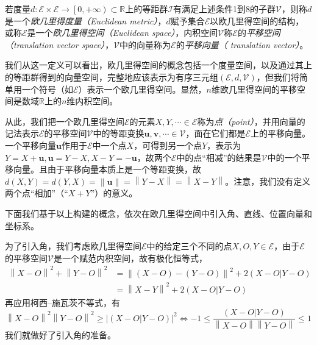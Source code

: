 \documentclass[main.tex]{subfiles}
\begin{document}
\begin{definition}[欧几里得空间]\label{def:II.3.5}
    若度量$d:\mathcal{E}\times\mathcal{E}\rightarrow\left[0,+\infty\right)\subset\mathbb{R}$上的等距群$\mathcal{I}$有满足上述条件1到8的子群$\mathcal{V}$，则称$d$是一个\emph{欧几里得度量（Euclidean metric）}，$d$赋予集合$\mathcal{E}$以欧几里得空间的结构，或称$\mathcal{E}$是一个\emph{欧几里得空间（Euclidean space）}，内积空间$\mathcal{V}$称$\mathcal{E}$的\emph{平移空间（translation vector space）}，$\mathcal{V}$中的向量称为$\mathcal{E}$的\emph{平移向量（ translation vector）}。
\end{definition}

我们从这一定义可以看出，欧几里得空间的概念包括一个度量空间，以及通过其上的等距群得到的向量空间，完整地应该表示为有序三元组$\left(\mathcal{E},d,\mathcal{V}\right)$，但我们将简单用一个符号（如$\mathcal{E}$）表示一个欧几里得空间。显然，$n$维欧几里得空间的平移空间是数域$\mathbb{R}$上的$n$维内积空间。

从此，我们把一个欧几里得空间$\mathcal{E}$的元素$X,Y,\cdots\in\mathcal{E}$称为\emph{点（point）}，并用向量的记法表示$\mathcal{E}$的平移空间$\mathcal{V}$中的等距变换$\mathbf{u},\mathbf{v},\cdots\in\mathcal{V}$，面在它们都是$\mathcal{E}$上的平移向量。一个平移向量$\mathbf{u}$作用于$\mathcal{E}$中一个点$X$，可得到另一个点$Y$，表示为$Y=X+\mathbf{u},\mathbf{u}=Y-X,X-Y=-\mathbf{u}$，故两个$\mathcal{E}$中的点“相减”的结果是$\mathcal{V}$中的一个平移向量。且由于平移向量本质上是一个等距变换，故$d\left(X,Y\right)=d\left(Y,X\right)=\left\|\mathbf{u}\right\|=\left\|Y-X\right\|=\left\|X-Y\right\|$。注意，我们没有定义两个点“相加”（“$X+Y$”）的意义。

下面我们基于以上构建的概念，依次在欧几里得空间中引入角、直线、位置向量和坐标系。

为了引入角，我们考虑欧几里得空间$\mathcal{E}$中的给定三个不同的点$X,O,Y\in\mathcal{E}$，由于$\mathcal{E}$的平移空间$\mathcal{V}$是一个赋范内积空间，故有极化恒等式，
\begin{align*}
    \left\|X-O\right\|^2+\left\|Y-O\right\|^2 & =\left\|\left(X-O\right)-\left(Y-O\right)\right\|^2+2\left(X-O|Y-O\right) \\
                                              & =\left\|X-Y\right\|^2+2\left(X-O|Y-O\right)
\end{align*}
再应用柯西--施瓦茨不等式，有
\[\left\|X-O\right\|^2\left\|Y-O\right\|^2\geq\left|\left(X-O|Y-O\right)\right|^2\Leftrightarrow-1\leq\frac{\left(X-O|Y-O\right)}{\left\|X-O\right\|\left\|Y-O\right\|}\leq1\]
我们就做好了引入角的准备。
\end{document}
